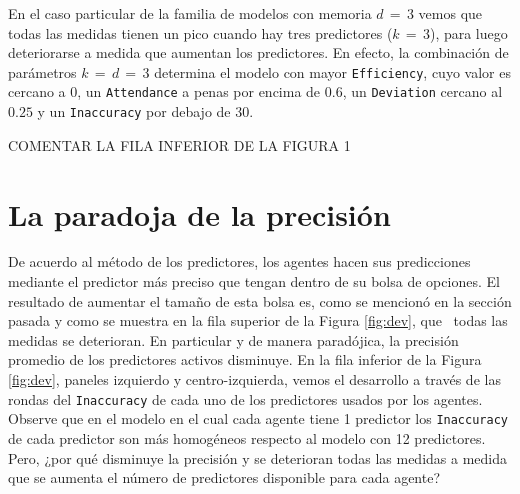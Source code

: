 \documentclass[11pt]{amsart}
\begin{document}
En el caso particular de la familia de modelos con memoria $d\,{=}\,3$ vemos que todas las medidas tienen un pico cuando hay tres predictores ($k\,{=}\,3$), para luego deteriorarse a medida que aumentan los predictores. En efecto, la combinación de parámetros $k\,{=}\,d\,{=}\,3$ determina el modelo con mayor \texttt{Efficiency}, cuyo valor es cercano a $0$, un \texttt{Attendance} a penas por encima de $0.6$, un \texttt{Deviation} cercano al $0.25$ y un \texttt{Inaccuracy} por debajo de $30$.

COMENTAR LA FILA INFERIOR DE LA FIGURA 1

\section{La paradoja de la precisión}\label{sec:parax}

De acuerdo al método de los predictores, los agentes hacen sus predicciones mediante el predictor más preciso que tengan dentro de su bolsa de opciones. El resultado de aumentar el tamaño de esta bolsa es, como se mencionó en la sección pasada y como se muestra en la fila superior de la Figura \ref{fig:dev}, que  todas las medidas se deterioran. En particular y de manera paradójica, la precisión promedio de los predictores activos disminuye. En la fila inferior de la Figura \ref{fig:dev}, paneles izquierdo y centro-izquierda, vemos el desarrollo a través de las rondas del \texttt{Inaccuracy} de cada uno de los predictores usados por los agentes. Observe que en el modelo en el cual cada agente tiene 1 predictor los \texttt{Inaccuracy} de cada predictor son más homogéneos respecto al modelo con 12 predictores. Pero, ¿por qué disminuye la precisión y se deterioran todas las medidas a medida que se aumenta el número de predictores disponible para cada agente? 
\end{document}
